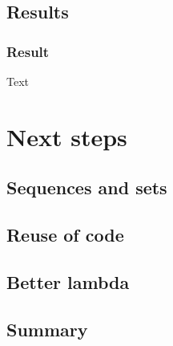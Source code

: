 \documentclass{beamer}
\begin{document}
\subsection{Results}
\begin{frame}
	\frametitle{Result}
	Text
\end{frame}

\section{Next steps}
\subsection{Sequences and sets}
\subsection{Reuse of code}
\subsection{Better lambda}
\subsection{Summary}
\end{document}
